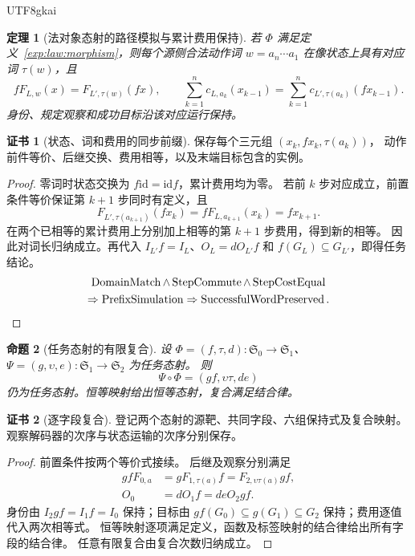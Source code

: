 \documentclass[12pt,a4paper,openany,notitlepage]{report}
\theoremstyle{plain}
\newtheorem{theorem}{定理}[chapter]
\newtheorem{proposition}[theorem]{命题}
\theoremstyle{definition}
\newtheorem*{certificate}{证书}
\theoremstyle{remark}
\begin{document}
\begin{CJK*}{UTF8}{gkai}
\begin{theorem}[法对象态射的路径模拟与累计费用保持]
\label{exp:law:simulation}
若 $\Phi$ 满足定义~\ref{exp:law:morphism}，则每个源侧合法动作词
$w=a_n\cdots a_1$ 在像状态上具有对应词 $\tau(w)$，且
\[
 fF_{L,w}(x)=F_{L',\tau(w)}(fx),\qquad
 \sum_{k=1}^n c_{L,a_k}(x_{k-1})
 =\sum_{k=1}^n c_{L',\tau(a_k)}(f x_{k-1}).
\]
身份、规定观察和成功目标沿该对应运行保持。
\end{theorem}
\begin{certificate}[状态、词和费用的同步前缀]
保存每个三元组 $(x_k,fx_k,\tau(a_k))$，
动作前件等价、后继交换、费用相等，以及末端目标包含的实例。
\end{certificate}
\begin{proof}
零词时状态交换为 $f\mathrm{id}=\mathrm{id}f$，累计费用均为零。
若前 $k$ 步对应成立，前置条件等价保证第 $k+1$ 步同时有定义，且
\[
 F_{L',\tau(a_{k+1})}(fx_k)=fF_{L,a_{k+1}}(x_k)=fx_{k+1}.
\]
在两个已相等的累计费用上分别加上相等的第 $k+1$ 步费用，得到新的相等。
因此对词长归纳成立。再代入 $I_{L'}f=I_L$、$O_L=dO_{L'}f$ 和
$f(G_L)\subseteq G_{L'}$，即得任务结论。
\begin{gather*}
 \operatorname{DomainMatch}\land\operatorname{StepCommute}\land\operatorname{StepCostEqual}\\
 \Rightarrow\operatorname{PrefixSimulation}
 \Rightarrow\operatorname{SuccessfulWordPreserved}.\qedhere
\end{gather*}
\end{proof}

\begin{proposition}[任务态射的有限复合]
\label{exp:law:composition}
设 $\Phi=(f,\tau,d):\mathfrak S_0\to\mathfrak S_1$、
$\Psi=(g,\upsilon,e):\mathfrak S_1\to\mathfrak S_2$ 为任务态射。
则
\[
 \Psi\circ\Phi=(gf,\upsilon\tau,de)
\]
仍为任务态射。恒等映射给出恒等态射，复合满足结合律。
\end{proposition}
\begin{certificate}[逐字段复合]
登记两个态射的源靶、共同字段、六组保持式及复合映射。
观察解码器的次序与状态运输的次序分别保存。
\end{certificate}
\begin{proof}
前置条件按两个等价式接续。
后继及观察分别满足
\[
 \begin{aligned}
 gfF_{0,a}&=gF_{1,\tau(a)}f
 =F_{2,\upsilon\tau(a)}gf,\\
 O_0&=dO_1f=deO_2gf.
 \end{aligned}
\]
身份由 $I_2gf=I_1f=I_0$ 保持；目标由
$gf(G_0)\subseteq g(G_1)\subseteq G_2$ 保持；费用逐值代入两次相等式。
恒等映射逐项满足定义，函数及标签映射的结合律给出所有字段的结合律。
任意有限复合由复合次数归纳成立。
\end{proof}


\end{CJK*}
\end{document}
